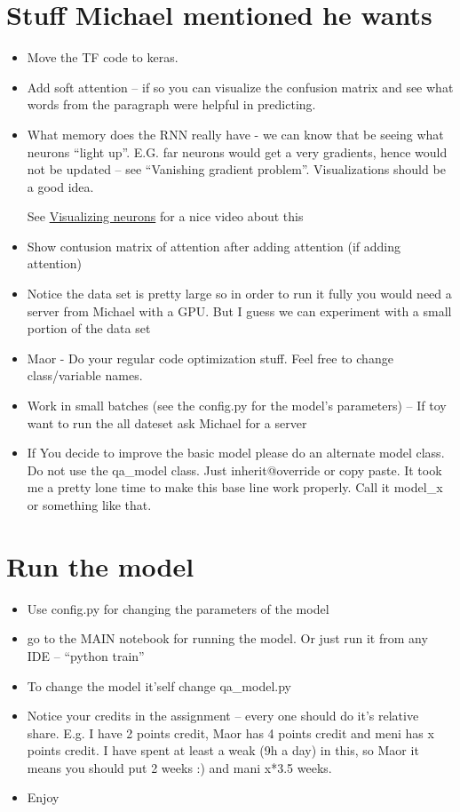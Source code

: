 \documentclass[paper=a4, fontsize=12pt]{scrartcl} %
\begin{document}
\section{Stuff Michael mentioned he  wants}
\begin{itemize}
		\item Move the TF code to keras.
		\item Add soft attention -- if so you can visualize the confusion matrix and see what words from the paragraph were helpful in predicting.
\item What memory does the RNN really have - we can know that be seeing what neurons ``light up''. E.G. far neurons would get a very gradients, hence would not be updated  -- see ``Vanishing gradient problem''.
Visualizations should be a good idea.

See \href{https://www.youtube.com/watch?v=6wcs6szJWMY&list=PL3FW7Lu3i5JvHM8ljYj-zLfQRF3EO8sYv&index=12&t=3s}{Visualizing neurons} for a nice video about this
\item Show contusion matrix of attention after adding attention (if adding attention)
\item Notice the data set is pretty large so in order to run it fully you would need a server from Michael with a GPU. But I guess we can experiment with a small portion of the data set

  
 \item Maor - Do your regular code optimization stuff.
 Feel free to change class/variable names.
 \item Work in small batches (see the config.py for the model's parameters) -- If toy want to run the all dateset ask Michael for a server
  \item If You decide to improve the basic model please do an alternate model class. Do not use the qa\_model class. Just inherit@override or copy paste. It took me a pretty lone time to make this base line work properly. Call it model\_x or something like that.
\end{itemize}
 
\section{Run the model}
\begin{itemize}
	
	\item Use config.py for changing the parameters of the model
	\item go to the MAIN notebook for running the model. Or just run it from  any IDE -- ``python train''
	\item To change the model it'self change qa\_model.py
	\item Notice your credits in the assignment -- every one should do it's relative share. E.g. I have 2 points credit, Maor has 4 points credit and meni has x points credit.
	I have spent at least a weak (9h a day) in this, so Maor it means you should put 2 weeks :) and mani x*3.5 weeks.
	\item Enjoy
\end{itemize}
\end{document}
